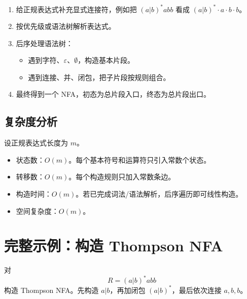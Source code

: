 \documentclass[UTF8,fontset=none,11pt]{ctexart}
\newcommand{\eps}{\varepsilon}
\begin{document}
\begin{enumerate}
  \item 给正规表达式补充显式连接符，例如把 \((a|b)^*abb\) 看成 \((a|b)^*\cdot a\cdot b\cdot b\)。
  \item 按优先级或语法树解析表达式。
  \item 后序处理语法树：
  \begin{itemize}
    \item 遇到字符、\(\eps\)、\(\emptyset\)，构造基本片段。
    \item 遇到连接、并、闭包，把子片段按规则组合。
  \end{itemize}
  \item 最终得到一个 NFA，初态为总片段入口，终态为总片段出口。
\end{enumerate}

\subsection{复杂度分析}

设正规表达式长度为 \(m\)。

\begin{itemize}
  \item 状态数：\(O(m)\)。每个基本符号和运算符只引入常数个状态。
  \item 转移数：\(O(m)\)。每个构造规则只加入常数条边。
  \item 构造时间：\(O(m)\)。若已完成词法/语法解析，后序遍历即可线性构造。
  \item 空间复杂度：\(O(m)\)。
\end{itemize}

\section{完整示例：构造 Thompson NFA}

对
\[
R=(a|b)^*abb
\]
构造 Thompson NFA。先构造 \(a|b\)，再加闭包 \((a|b)^*\)，最后依次连接 \(a,b,b\)。
\end{document}
